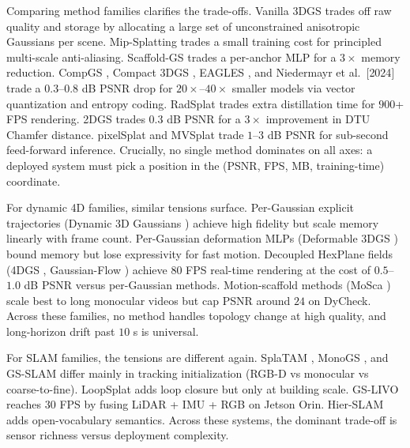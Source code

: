 \documentclass{article}
\begin{document}
Comparing method families clarifies the trade-offs. Vanilla 3DGS \cite{kerbl20233dgaussiansplattin} trades off raw quality and storage by allocating a large set of unconstrained anisotropic Gaussians per scene. Mip-Splatting \cite{yu2024mipsplattingaliasf} trades a small training cost for principled multi-scale anti-aliasing. Scaffold-GS \cite{lu2024scaffoldgsstructur} trades a per-anchor MLP for a \(3{\times}\) memory reduction. CompGS \cite{navaneet2024compgssmallerandfa}, Compact 3DGS \cite{lee2024compact3dgaussianr}, EAGLES \cite{girish2024eaglesefficientacc}, and Niedermayr et al.~{[}2024{]} trade a \(0.3\)--\(0.8\) dB PSNR drop for \(20{\times}\)--\(40{\times}\) smaller models via vector quantization and entropy coding. RadSplat \cite{niemeyer2025radsplatradiancefi} trades extra distillation time for \(900\)+ FPS rendering. 2DGS \cite{huang20242dgaussiansplattin} trades \(0.3\) dB PSNR for a \(3{\times}\) improvement in DTU Chamfer distance. pixelSplat \cite{charatan2024pixelsplat3dgaussi} and MVSplat \cite{chen2024textto3dusinggauss} trade \(1\)--\(3\) dB PSNR for sub-second feed-forward inference. Crucially, no single method dominates on all axes: a deployed system must pick a position in the (PSNR, FPS, MB, training-time) coordinate.

For dynamic 4D families, similar tensions surface. Per-Gaussian explicit trajectories (Dynamic 3D Gaussians \cite{luiten2024dynamic3dgaussians}) achieve high fidelity but scale memory linearly with frame count. Per-Gaussian deformation MLPs (Deformable 3DGS \cite{yang2024deformable3dgaussi}) bound memory but lose expressivity for fast motion. Decoupled HexPlane fields (4DGS \cite{wu2024recentadvancesin3d}, Gaussian-Flow \cite{lin2024gaussianflow4dreco}) achieve \(80\) FPS real-time rendering at the cost of \(0.5\)--\(1.0\) dB PSNR versus per-Gaussian methods. Motion-scaffold methods (MoSca \cite{lei2025moscadynamicgaussi}) scale best to long monocular videos but cap PSNR around \(24\) on DyCheck. Across these families, no method handles topology change at high quality, and long-horizon drift past \(10\) s is universal.

For SLAM families, the tensions are different again. SplaTAM \cite{keetha2024splatamsplattracka}, MonoGS \cite{matsuki2024gaussiansplattings}, and GS-SLAM \cite{yan2024multiscale3dgaussi} differ mainly in tracking initialization (RGB-D vs monocular vs coarse-to-fine). LoopSplat \cite{zhu2025loopsplatloopclosu} adds loop closure but only at building scale. GS-LIVO \cite{hong2025gslivorealtimelida} reaches \(30\) FPS by fusing LiDAR + IMU + RGB on Jetson Orin. Hier-SLAM \cite{li2025hierslamscalingups} adds open-vocabulary semantics. Across these systems, the dominant trade-off is sensor richness versus deployment complexity.
\end{document}
